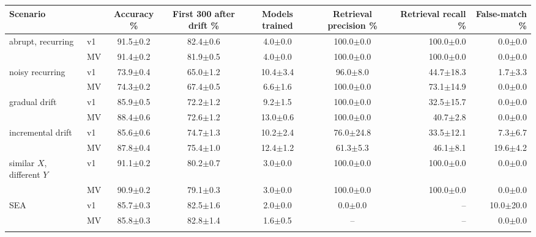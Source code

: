 \renewcommand{\arraystretch}{1.25}\begin{tabular}{@{}llccccrr@{}}\toprule
\textbf{Scenario} & & \textbf{Accuracy \%} & \textbf{First 300 after drift \%} & \textbf{Models trained} & \textbf{Retrieval precision \%} & \textbf{Retrieval recall \%} & \textbf{False-match \%}\\\midrule
abrupt, recurring & v1 & 91.5$\pm$0.2 & 82.4$\pm$0.6 & 4.0$\pm$0.0 & 100.0$\pm$0.0 & 100.0$\pm$0.0 & 0.0$\pm$0.0 \\
 & MV & 91.4$\pm$0.2 & 81.9$\pm$0.5 & 4.0$\pm$0.0 & 100.0$\pm$0.0 & 100.0$\pm$0.0 & 0.0$\pm$0.0 \\
\addlinespace[2pt]
noisy recurring & v1 & 73.9$\pm$0.4 & 65.0$\pm$1.2 & 10.4$\pm$3.4 & 96.0$\pm$8.0 & 44.7$\pm$18.3 & 1.7$\pm$3.3 \\
 & MV & 74.3$\pm$0.2 & 67.4$\pm$0.5 & 6.6$\pm$1.6 & 100.0$\pm$0.0 & 73.1$\pm$14.9 & 0.0$\pm$0.0 \\
\addlinespace[2pt]
gradual drift & v1 & 85.9$\pm$0.5 & 72.2$\pm$1.2 & 9.2$\pm$1.5 & 100.0$\pm$0.0 & 32.5$\pm$15.7 & 0.0$\pm$0.0 \\
 & MV & 88.4$\pm$0.6 & 72.6$\pm$1.2 & 13.0$\pm$0.6 & 100.0$\pm$0.0 & 40.7$\pm$2.8 & 0.0$\pm$0.0 \\
\addlinespace[2pt]
incremental drift & v1 & 85.6$\pm$0.6 & 74.7$\pm$1.3 & 10.2$\pm$2.4 & 76.0$\pm$24.8 & 33.5$\pm$12.1 & 7.3$\pm$6.7 \\
 & MV & 87.8$\pm$0.4 & 75.4$\pm$1.0 & 12.4$\pm$1.2 & 61.3$\pm$5.3 & 46.1$\pm$8.1 & 19.6$\pm$4.2 \\
\addlinespace[2pt]
similar $X$, different $Y$ & v1 & 91.1$\pm$0.2 & 80.2$\pm$0.7 & 3.0$\pm$0.0 & 100.0$\pm$0.0 & 100.0$\pm$0.0 & 0.0$\pm$0.0 \\
 & MV & 90.9$\pm$0.2 & 79.1$\pm$0.3 & 3.0$\pm$0.0 & 100.0$\pm$0.0 & 100.0$\pm$0.0 & 0.0$\pm$0.0 \\
\addlinespace[2pt]
SEA & v1 & 85.7$\pm$0.3 & 82.5$\pm$1.6 & 2.0$\pm$0.0 & 0.0$\pm$0.0 & -- & 10.0$\pm$20.0 \\
 & MV & 85.8$\pm$0.3 & 82.8$\pm$1.4 & 1.6$\pm$0.5 & -- & -- & 0.0$\pm$0.0 \\
\addlinespace[2pt]
\bottomrule\end{tabular}

